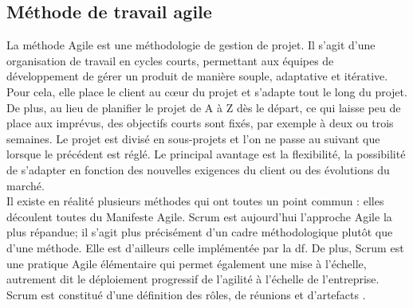 \subsection{M\'ethode de travail agile}
La méthode Agile est une méthodologie de gestion de projet. Il s'agit d'une organisation de travail en cycles courts, permettant aux équipes de développement de gérer un produit de manière souple, adaptative et itérative. Pour cela, elle place le client au cœur du projet et s’adapte tout le long  du projet. De plus, au lieu de planifier le projet de A à Z dès le départ, ce qui laisse peu de place aux imprévus, des objectifs courts sont fixés, par exemple à deux ou trois semaines. Le projet est divisé en sous-projets et l’on ne passe au suivant que lorsque le précédent est réglé. Le principal avantage est la flexibilité, la possibilité de s’adapter en fonction des nouvelles exigences du client ou des évolutions du marché. \\

Il existe en réalité plusieurs méthodes qui ont toutes un point commun : elles découlent toutes du Manifeste Agile. Scrum est aujourd’hui l’approche Agile la plus répandue; il s'agit plus précisément d'un cadre m\'ethodologique plut\^ot que d'une m\'ethode. Elle est d'ailleurs celle impl\'ement\'ee par la \acrshort{df}. De plus, Scrum est une pratique Agile élémentaire qui permet également une mise à l’échelle, autrement dit le déploiement progressif de l’agilité à l’échelle de l’entreprise. 
Scrum est constitué d'une définition des rôles, de réunions et d'artefacts \cite{Nutcache_agile} \cite{Agiliste_agile}. 


